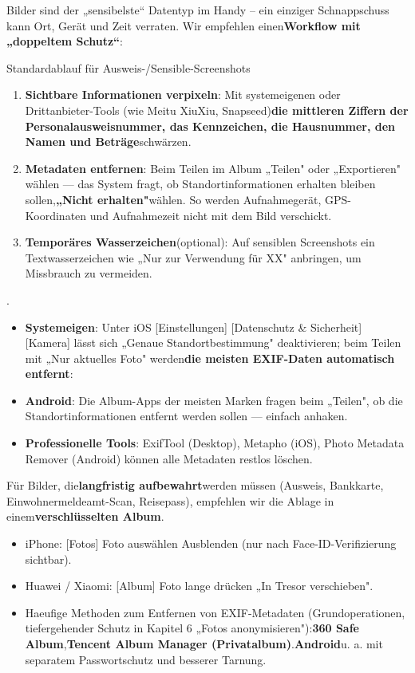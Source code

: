 
Bilder sind der „sensibelste“ Datentyp im Handy – ein einziger Schnappschuss kann Ort, Gerät und Zeit verraten. Wir empfehlen einen\textbf{Workflow mit „doppeltem Schutz“}:

\begin{tcbwarn}{Standardablauf für Ausweis-/Sensible-Screenshots}
\begin{enumerate}
  \item \textbf{Sichtbare Informationen verpixeln}: Mit systemeigenen oder Drittanbieter-Tools (wie Meitu XiuXiu, Snapseed)\textbf{die mittleren Ziffern der Personalausweisnummer, das Kennzeichen, die Hausnummer, den Namen und Beträge}schwärzen.
  \item \textbf{Metadaten entfernen}: Beim Teilen im Album „Teilen" oder „Exportieren" wählen — das System fragt, ob Standortinformationen erhalten bleiben sollen,\textbf{„Nicht erhalten"}wählen. So werden Aufnahmegerät, GPS-Koordinaten und Aufnahmezeit nicht mit dem Bild verschickt.
  \item \textbf{Temporäres Wasserzeichen}(optional): Auf sensiblen Screenshots ein Textwasserzeichen wie „Nur zur Verwendung für XX" anbringen, um Missbrauch zu vermeiden.
\end{enumerate}

\end{tcbwarn}

.

\begin{itemize}
  \item \textbf{Systemeigen}: Unter iOS [Einstellungen] [Datenschutz \& Sicherheit] [Kamera] lässt sich „Genaue Standortbestimmung" deaktivieren; beim Teilen mit „Nur aktuelles Foto" werden\textbf{die meisten EXIF-Daten automatisch entfernt}:
  \item \textbf{Android}: Die Album-Apps der meisten Marken fragen beim „Teilen", ob die Standortinformationen entfernt werden sollen — einfach anhaken.
  \item \textbf{Professionelle Tools}: ExifTool (Desktop), Metapho (iOS), Photo Metadata Remover (Android) können alle Metadaten restlos löschen.
\end{itemize}

Für Bilder, die\textbf{langfristig aufbewahrt}werden müssen (Ausweis, Bankkarte, Einwohnermeldeamt-Scan, Reisepass), empfehlen wir die Ablage in einem\textbf{verschlüsselten Album}.

\begin{itemize}
  \item iPhone: [Fotos] Foto auswählen Ausblenden (nur nach Face-ID-Verifizierung sichtbar).
  \item Huawei / Xiaomi: [Album] Foto lange drücken „In Tresor verschieben".
  \item Haeufige Methoden zum Entfernen von EXIF-Metadaten (Grundoperationen, tiefergehender Schutz in Kapitel 6 „Fotos anonymisieren"):\textbf{360 Safe Album},\textbf{Tencent Album Manager (Privatalbum)}.\textbf{Android}u. a. mit separatem Passwortschutz und besserer Tarnung.
\end{itemize}
